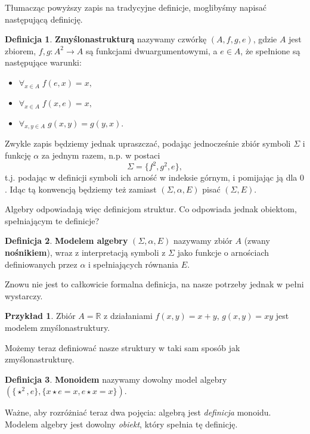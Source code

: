 \documentclass{article}
\theoremstyle{definition}
\newtheorem{definition}{Definicja}[section]
\newtheorem{example}{Przykład}[section]
\begin{document}
Tłumacząc powyższy zapis na tradycyjne definicje, moglibyśmy napisać następującą definicję.
\begin{definition}
	\textbf{Zmyślonastrukturą} nazywamy czwórkę $(A, f, g, e)$, gdzie $A$ jest zbiorem, $f, g: A^2 \to A$ są funkcjami dwuargumentowymi, a $e \in A$, że spełnione są następujące warunki:
	\begin{itemize}
		\item $\forall_{x\in A}\; f(e, x) = x,$
		\item $\forall_{x\in A}\; f(x, e) = x,$
		\item $\forall_{x,y\in A}\; g(x, y) = g(y, x).$
	\end{itemize}
\end{definition}

Zwykle zapis będziemy jednak upraszczać, podając jednocześnie zbiór symboli $\Sigma$ i funkcję $\alpha$ za jednym razem, n.p. w postaci
\begin{equation}
	\Sigma = \{f^2, g^2, e\},
\end{equation}
t.j. podając w definicji symboli ich arność w indeksie górnym, i pomijając ją dla $0$.
Idąc tą konwencją będziemy też zamiast $(\Sigma, \alpha, E)$ pisać $(\Sigma, E)$.

Algebry odpowiadają więc definicjom struktur.
Co odpowiada jednak obiektom, spełniającym te definicje?

\begin{definition}
    \textbf{Modelem algebry} $(\Sigma, \alpha, E)$ nazywamy zbiór $A$ (zwany \textbf{nośnikiem}),
	wraz z interpretacją symboli z $\Sigma$ jako funkcje o arnościach definiowanych przez $\alpha$ i spełniających równania $E$.
\end{definition}
Znowu nie jest to całkowicie formalna definicja,
na nasze potrzeby jednak w pełni wystarczy.

\begin{example}
	Zbiór $A = \mathbb{R}$ z działaniami $f(x, y) = x + y$, $g(x, y) = xy$ jest modelem zmyślonastruktury.
\end{example}

Możemy teraz definiować nasze struktury w taki sam sposób jak zmyślonastrukturę.
\begin{definition}
	\textbf{Monoidem} nazywamy dowolny model algebry $(\{\star^2, e\}, \{ x \star e = x, e \star x = x \})$.
\end{definition}

Ważne, aby rozróżniać teraz dwa pojęcia: algebrą jest \textit{definicja} monoidu.
Modelem algebry jest dowolny \textit{obiekt}, który spełnia tę definicję.
\end{document}
